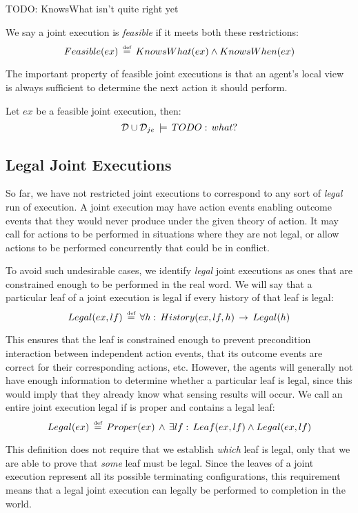 TODO: KnowsWhat isn't quite right yet

We say a joint execution is \emph{feasible} if it meets both these
restrictions:\[
Feasible(ex)\,\stackrel{\mbox{\tiny def}}{=}\, KnowsWhat(ex)\wedge KnowsWhen(ex)\]


The important property of feasible joint executions is that an agent's
local view is always sufficient to determine the next action it should
perform.

\begin{thm}
Let $ex$ be a feasible joint execution, then:\[
\mathcal{D}\cup\mathcal{D}_{je}\,\models\, TODO:\, what?\]

\end{thm}

\subsection{Legal Joint Executions}

So far, we have not restricted joint executions to correspond to any
sort of \emph{legal} run of execution. A joint execution may have
action events enabling outcome events that they would never produce
under the given theory of action. It may call for actions to be performed
in situations where they are not legal, or allow actions to be performed
concurrently that could be in conflict.

To avoid such undesirable cases, we identify \emph{legal} joint executions
as ones that are constrained enough to be performed in the real word.
We will say that a particular leaf of a joint execution is legal if
every history of that leaf is legal:\[
Legal(ex,lf)\,\stackrel{\mbox{\tiny def}}{=}\,\forall h:\, History(ex,lf,h)\,\rightarrow\, Legal(h)\]


This ensures that the leaf is constrained enough to prevent precondition
interaction between independent action events, that its outcome events
are correct for their corresponding actions, etc. However, the agents
will generally not have enough information to determine whether a
particular leaf is legal, since this would imply that they already
know what sensing results will occur. We call an entire joint execution
legal if is proper and contains a legal leaf:\[
Legal(ex)\,\stackrel{\mbox{\tiny def}}{=}\, Proper(ex)\,\wedge\,\exists lf:\, Leaf(ex,lf)\wedge Legal(ex,lf)\]


This definition does not require that we establish \emph{which} leaf
is legal, only that we are able to prove that \emph{some} leaf must
be legal. Since the leaves of a joint execution represent all its
possible terminating configurations, this requirement means that a
legal joint execution can legally be performed to completion in the
world.

